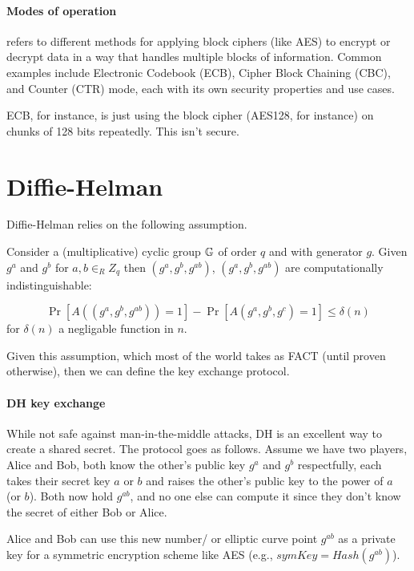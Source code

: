 \paragraph{Modes of operation}
refers to different methods for applying block ciphers (like AES) to encrypt or decrypt data in a way that handles multiple blocks of information.
Common examples include Electronic Codebook (ECB), Cipher Block Chaining (CBC), and Counter (CTR) mode, each with its own security properties and use cases.


ECB, for instance, is just using the block cipher (AES128, for instance) on chunks of 128 bits repeatedly. This isn't secure.

\section{Diffie-Helman}
Diffie-Helman relies on the following assumption.

\begin{definition} \label{DDH}
  Consider a (multiplicative) cyclic group $\mathbb{G}$ of order $q$ and with generator $g$. 
  Given $g^a$ and $g^b$ for $a,b\in_R Z_q$ then $(g^a,g^b,g^{ab})$, $(g^a,g^b,g^{ab})$ are computationally indistinguishable:

  $$ \Pr[A((g^a,g^b,g^{ab}))=1] - \Pr[A(g^a,g^b,g^{c})=1]\le \delta(n)$$
  for $\delta(n)$ a negligable function in $n$.
\end{definition}

Given this assumption, which most of the world takes as FACT (until proven otherwise), then
we can define the key exchange protocol.
\paragraph{DH key exchange}
While not safe against man-in-the-middle attacks, DH is an excellent way to create a shared secret.
The protocol goes as follows.
Assume we have two players, Alice and Bob, both know the other's public key $g^a$ and $g^b$ respectfully,
each takes their secret key $a$ or $b$ and raises the other's public key to the power of $a$ (or $b$).
Both now hold $g^{ab}$, and no one else can compute it since they don't know the secret of either Bob or Alice.

Alice and Bob can use this new number/ or elliptic curve point $g^{ab}$ as a private key for
a symmetric encryption scheme like AES (e.g., $symKey=Hash(g^{ab})$).




